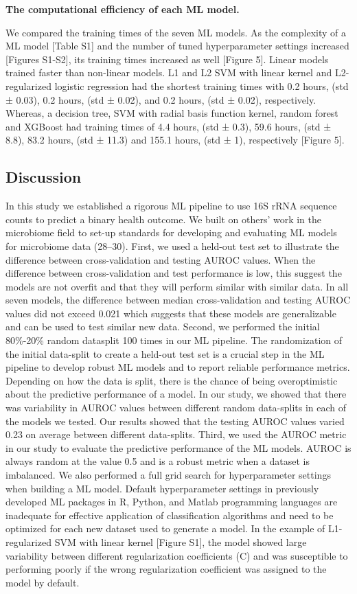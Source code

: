 \documentclass[11pt,]{article}
\begin{document}
\textbf{The computational efficiency of each ML model.}

We compared the training times of the seven ML models. As the complexity
of a ML model {[}Table S1{]} and the number of tuned hyperparameter
settings increased {[}Figures S1-S2{]}, its training times increased as
well {[}Figure 5{]}. Linear models trained faster than non-linear
models. L1 and L2 SVM with linear kernel and L2-regularized logistic
regression had the shortest training times with 0.2 hours, (std ± 0.03),
0.2 hours, (std ± 0.02), and 0.2 hours, (std ± 0.02), respectively.
Whereas, a decision tree, SVM with radial basis function kernel, random
forest and XGBoost had training times of 4.4 hours, (std ± 0.3), 59.6
hours, (std ± 8.8), 83.2 hours, (std ± 11.3) and 155.1 hours, (std ± 1),
respectively {[}Figure 5{]}.

\subsection{Discussion}\label{discussion}

In this study we established a rigorous ML pipeline to use 16S rRNA
sequence counts to predict a binary health outcome. We built on others'
work in the microbiome field to set-up standards for developing and
evaluating ML models for microbiome data (28--30). First, we used a
held-out test set to illustrate the difference between cross-validation
and testing AUROC values. When the difference between cross-validation
and test performance is low, this suggest the models are not overfit and
that they will perform similar with similar data. In all seven models,
the difference between median cross-validation and testing AUROC values
did not exceed 0.021 which suggests that these models are generalizable
and can be used to test similar new data. Second, we performed the
initial 80\%-20\% random datasplit 100 times in our ML pipeline. The
randomization of the initial data-split to create a held-out test set is
a crucial step in the ML pipeline to develop robust ML models and to
report reliable performance metrics. Depending on how the data is split,
there is the chance of being overoptimistic about the predictive
performance of a model. In our study, we showed that there was
variability in AUROC values between different random data-splits in each
of the models we tested. Our results showed that the testing AUROC
values varied 0.23 on average between different data-splits. Third, we
used the AUROC metric in our study to evaluate the predictive
performance of the ML models. AUROC is always random at the value 0.5
and is a robust metric when a dataset is imbalanced. We also performed a
full grid search for hyperparameter settings when building a ML model.
Default hyperparameter settings in previously developed ML packages in
R, Python, and Matlab programming languages are inadequate for effective
application of classification algorithms and need to be optimized for
each new dataset used to generate a model. In the example of
L1-regularized SVM with linear kernel {[}Figure S1{]}, the model showed
large variability between different regularization coefficients (C) and
was susceptible to performing poorly if the wrong regularization
coefficient was assigned to the model by default.
\end{document}

